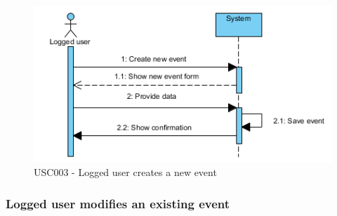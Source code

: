 \documentclass[10pt,a4paper,titlepage]{article}
\begin{document}
\begin{figure}[h]
\centering
\includegraphics[width=\linewidth]{./Sequence_diag/USC003.png}
\caption[USC003]{USC003 - Logged user creates a new event}
\label{fig:USC003}
\end{figure}

\clearpage
\subsubsection{Logged user modifies an existing event}
\end{document}
